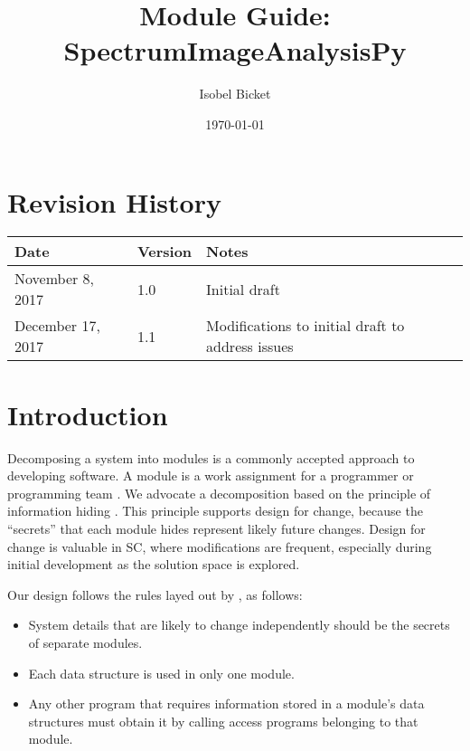 \documentclass[12pt, titlepage]{article}
\newcommand{\progname}{SpectrumImageAnalysisPy}
\begin{document}

\title{Module Guide: \progname} 
\author{Isobel Bicket}
\date{\today}

\maketitle


\section{Revision History}

\begin{tabularx}{\textwidth}{p{4cm}p{2cm}X}
\toprule {\bf Date} & {\bf Version} & {\bf Notes}\\
\midrule
November 8, 2017 & 1.0 & Initial draft\\
December 17, 2017 & 1.1 & Modifications to initial draft to address issues\\
\bottomrule
\end{tabularx}

\newpage

\tableofcontents

\listoftables

\listoffigures

\newpage


\section{Introduction}

Decomposing a system into modules is a commonly accepted approach to developing
software.  A module is a work assignment for a programmer or programming
team \cite{parnas_modular_1985}.  We advocate a decomposition
based on the principle of information hiding \cite{Parnas1972a}.  This
principle supports design for change, because the ``secrets'' that each module
hides represent likely future changes.  Design for change is valuable in SC,
where modifications are frequent, especially during initial development as the
solution space is explored.  

Our design follows the rules layed out by \cite{parnas_modular_1985}, as
follows:
\begin{itemize}
\item System details that are likely to change independently should be the
  secrets of separate modules.
\item Each data structure is used in only one module.
\item Any other program that requires information stored in a module's data
  structures must obtain it by calling access programs belonging to that module.
\end{itemize}
\end{document}
